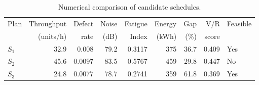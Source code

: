 \begin{table}[htbp]
\centering
\caption{Numerical comparison of candidate schedules.}
\label{tab:numerical-sim}
\small
\begin{tabular}{@{}lrrrrrrrl@{}}
\toprule
Plan & Throughput & Defect & Noise & Fatigue & Energy & Gap & V/R & Feasible \\
     & (units/h)  & rate   & (dB)  & Index   & (kWh)  & (\%) & score &         \\
\midrule
$S_{1}$ & 32.9 & 0.008 & 79.2 & 0.3117 & 375 & 36.7 & 0.409 & Yes \\
$S_{2}$ & 45.6 & 0.0097 & 83.5 & 0.5767 & 459 & 29.8 & 0.447 & No \\
$S_{3}$ & 24.8 & 0.0077 & 78.7 & 0.2741 & 359 & 61.8 & 0.369 & Yes \\
\bottomrule
\end{tabular}
\end{table}

